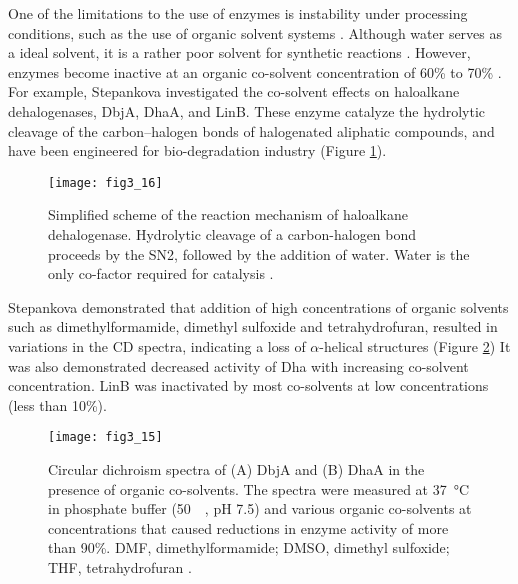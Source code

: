 \begin{refsection}
One of the limitations to the use of enzymes is instability under processing
conditions, such as the use of organic solvent systems \cite{Stepankova2013}.
Although water serves as a ideal solvent, it is a rather poor solvent for
synthetic reactions \cite{Serdakowski2008}. However, enzymes become inactive at
an organic co-solvent concentration of 60\% to 70\% \cite{Stepankova2013}. For
example, Stepankova  investigated the co-solvent effects on
haloalkane dehalogenases, DbjA, DhaA, and LinB. These enzyme catalyze the
hydrolytic cleavage of the carbon–halogen bonds of halogenated aliphatic
compounds, and have been engineered for bio-degradation industry
\cite{Stepankova2013a,Koudelakova2013} (Figure \ref{fig:hld}).
\begin{figure}[htbp] \centering \texttt{[image: fig3\_16]} 
    \caption[Simplified scheme of the reaction mechanism of haloalkane
    dehalogenase. Hydrolytic cleavage of a carbon-halogen bond proceeds by the
SN2, followed by the addition of water. Water is the only co-factor required
for catalysis]{Simplified scheme of the reaction mechanism of haloalkane
    dehalogenase. Hydrolytic cleavage of a carbon-halogen bond proceeds by the
    SN2, followed by the addition of water. Water is the only co-factor
    required for catalysis \cite{Koudelakova2013}.} 
    \label{fig:hld}
\end{figure}

Stepankova  demonstrated that addition of high concentrations of
organic solvents such as dimethylformamide, dimethyl sulfoxide and
tetrahydrofuran, resulted in variations in the CD spectra, indicating a loss of
$\alpha$-helical structures \cite{Stepankova2013a} (Figure
\ref{fig:organic-effect}) It was also demonstrated decreased activity of Dha
with increasing co-solvent concentration. LinB was inactivated by most
co-solvents at low concentrations (less than 10\%).
\begin{figure}[htbp] \centering \texttt{[image: fig3\_15]} 
    \caption[Circular dichroism spectra of (A) DbjA and (B) DhaA in the
    presence of organic co-solvents. The spectra were measured at
\SI{37}{\celsius} in phosphate buffer (\SI{50}{\milli\Molar}, pH 7.5) and
various organic co-solvents at concentrations that caused reductions in enzyme
activity of more than 90\%. DMF, dimethylformamide; DMSO, dimethyl sulfoxide;
THF, tetrahydrofuran.]{Circular dichroism spectra of (A) DbjA and (B) DhaA in
    the presence of organic co-solvents. The spectra were measured at
    \SI{37}{\celsius} in phosphate buffer (\SI{50}{\milli\Molar}, pH 7.5) and
    various organic co-solvents at concentrations that caused reductions in
    enzyme activity of more than 90\%. DMF, dimethylformamide; DMSO, dimethyl
    sulfoxide; THF, tetrahydrofuran \cite{Stepankova2013a}.}
    \label{fig:organic-effect} 
\end{figure}


\end{refsection}
